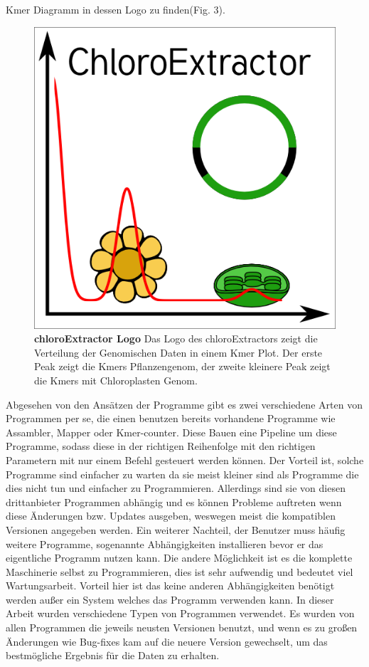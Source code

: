 \documentclass{scrartcl}
\begin{document}
Kmer Diagramm in dessen Logo zu finden(Fig. 3).
\begin{figure}
\includegraphics[width=.9\linewidth]{./logo512.png}
\caption[chloroExtractors Logo]{\textbf{chloroExtractor Logo} Das Logo des chloroExtractors zeigt die Verteilung der Genomischen Daten in einem Kmer Plot. Der erste Peak zeigt die Kmers Pflanzengenom, der zweite kleinere Peak zeigt die Kmers mit Chloroplasten Genom.}
\end{figure}
Abgesehen von den Ansätzen der Programme gibt es zwei verschiedene Arten von Programmen per se, die einen benutzen bereits vorhandene Programme wie Assambler, Mapper oder Kmer-counter. Diese 
Bauen eine Pipeline um diese Programme, sodass diese in der richtigen Reihenfolge mit den richtigen Parametern mit nur einem Befehl gesteuert werden können. Der Vorteil ist, solche Programme
sind einfacher zu warten da sie meist kleiner sind als Programme die dies nicht tun und einfacher zu Programmieren. Allerdings sind sie von diesen drittanbieter Programmen abhängig und es können Probleme 
auftreten wenn diese Änderungen bzw. Updates ausgeben, weswegen meist die kompatiblen Versionen angegeben werden. Ein weiterer Nachteil, der Benutzer muss häufig weitere Programme, sogenannte Abhängigkeiten installieren
bevor er das eigentliche Programm nutzen kann. Die andere Möglichkeit ist es die komplette Maschinerie selbst zu Programmieren, dies ist sehr aufwendig und bedeutet viel Wartungsarbeit. Vorteil hier
ist das keine anderen Abhängigkeiten benötigt werden außer ein System welches das Programm verwenden kann. In dieser Arbeit wurden verschiedene Typen von Programmen verwendet.
Es wurden von allen Programmen die jeweils neusten Versionen benutzt, und wenn es zu großen Änderungen wie Bug-fixes kam auf die neuere Version gewechselt, um das bestmögliche Ergebnis für die Daten
zu erhalten.
\end{document}
